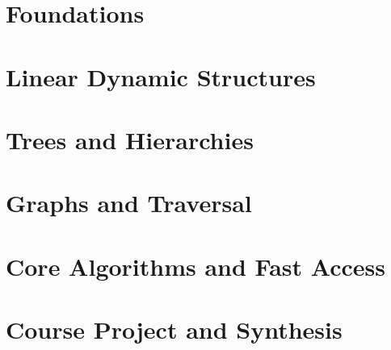 \documentclass[11pt,oneside,a4paper]{report}
\begin{document}
\utpfrontmatter



\part{Foundations}






\part{Linear Dynamic Structures}









\part{Trees and Hierarchies}





\part{Graphs and Traversal}



\part{Core Algorithms and Fast Access}





\part{Course Project and Synthesis}

\end{document}
